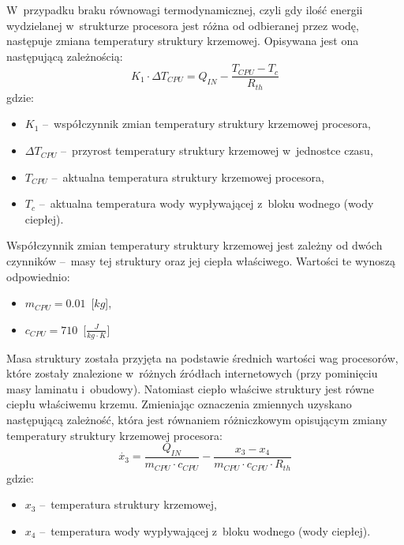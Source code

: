 W~przypadku braku równowagi termodynamicznej, czyli gdy ilość energii
wydzielanej w~strukturze procesora jest różna od odbieranej przez wodę,
następuje zmiana temperatury struktury krzemowej. Opisywana jest ona następującą
zależnością:
\begin{equation}
    K_1 \cdot \Delta T_{CPU} = Q_{IN} - \frac{T_{CPU} - T_c}{R_{th}}
    \label{equ:dtcpu}
\end{equation}
gdzie:
\begin{itemize}
    \item $K_1$ --~współczynnik zmian temperatury struktury krzemowej procesora,
    \item $\Delta T_{CPU}$ --~przyrost temperatury struktury krzemowej
    w~jednostce czasu,
    \item $T_{CPU}$ --~aktualna temperatura struktury krzemowej procesora,
    \item $T_c$ --~aktualna temperatura wody wypływającej z~bloku wodnego (wody
    ciepłej).
\end{itemize}

Współczynnik zmian temperatury struktury krzemowej jest zależny od dwóch
czynników --~masy tej struktury oraz jej ciepła właściwego. Wartości te wynoszą
odpowiednio:
\begin{itemize}
    \item $m_{CPU} = 0.01$~[$kg$],
    \item $c_{CPU} = 710$~[$\frac{J}{kg \cdot K}$]
\end{itemize}
Masa struktury została przyjęta na podstawie średnich wartości wag procesorów,
które zostały znalezione w~różnych źródłach internetowych (przy pominięciu masy
laminatu i~obudowy). Natomiast ciepło właściwe struktury jest równe ciepłu
właściwemu krzemu. Zmieniając oznaczenia zmiennych uzyskano następującą
zależność, która jest równaniem różniczkowym opisującym zmiany temperatury
struktury krzemowej procesora:
\begin{equation}
    \dot{x_3} = \frac{Q_{IN}}{m_{CPU} \cdot c_{CPU}} - \frac{x_3 - x_4}{m_{CPU}
    \cdot c_{CPU} \cdot R_{th}}
    \label{equ:x3}
\end{equation}
gdzie:
\begin{itemize}
    \item $x_3$ --~temperatura struktury krzemowej,
    \item $x_4$ --~temperatura wody wypływającej z~bloku wodnego (wody ciepłej).
\end{itemize}

\newpage

